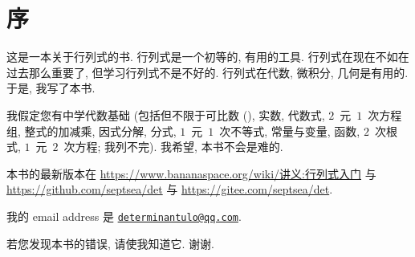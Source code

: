 \documentclass[../libro.tex]{subfiles}
\begin{document}
\ifSubfilesClassLoaded{\frontmatter}{}

\chapter{序}

这是一本关于行列式的书.
行列式是一个初等的, 有用的工具.
行列式在现在不如在过去那么重要了,
但学习行列式不是不好的.
行列式在代数, 微积分, 几何是有用的.
于是, 我写了本书.

我假定您有中学代数基础
(包括但不限于可比数 (), %
实数,
代数式,
\(2\)~元~\(1\)~次方程组,
整式的加减乘,
因式分解,
分式,
\(1\)~元~\(1\)~次不等式,
常量与变量,
函数,
\(2\)~次根式,
\(1\)~元~\(2\)~次方程;
我列不完). %
我希望, 本书不会是难的.


本书的最新版本在
\url{https://www.bananaspace.org/wiki/讲义:行列式入门}
与
\url{https://github.com/septsea/det}
与
\url{https://gitee.com/septsea/det}.

我的 email address 是
\href{mailto:determinantulo@qq.com}{\texttt{determinantulo@qq.com}}.

若您发现本书的错误, 请使我知道它.
谢谢.

\vspace{4ex}\inscribe{\laauxtoro}{\ladato}
\end{document}
